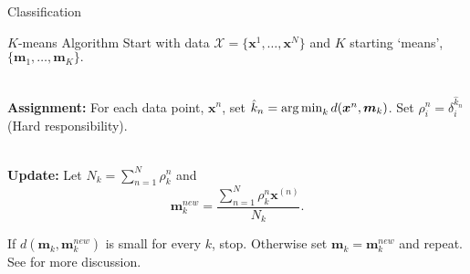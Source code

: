 \documentclass{beamer}
\begin{document}
	\begin{frame}{Classification}
		\begin{figure}
			\centering
			\begin{subfigure}{.7\linewidth}
				
			\end{subfigure}
			\pause
		\end{figure}
	\end{frame}

	\begin{frame}{$K$-means Algorithm}
		Start with data \( \mathcal{X} = \{\bm x^{1},\ldots,\bm x^N\} \) and $K$ starting `means', \( \{\bm m_1,\ldots,\bm m_K\}. \)
		
		\ \\
		
		\alert<2>{\textbf{Assignment:}} For each data point, \(\bm x^{n}\), set 
			\(\hat{k}_n = \operatorname*{arg\,min}_k d(\bm x^{n},\bm m_k)\). Set \alert<3>{\( \rho_i^n = \delta_i^{\hat{k}_n} \) (Hard responsibility)}.
		
		\ \\
		
		\alert<4>{\textbf{Update:}} Let \(N_k = \sum_{n=1}^{N} \rho^n_k\) and 
			\[\bm m_k^{new} = \frac{\sum_{n=1}^{N} \rho_k^n \bm x^{(n)}}{N_k}.\]
		
		If \(d(\bm m_k ,\bm m_k^{new})\) is small for every \( k \), stop.  Otherwise set \(\bm m_k = \bm m_k^{new}\) and \alert<5>{repeat}. See \citet{MacKay2002} for more discussion.
		
	\end{frame}
\end{document}
